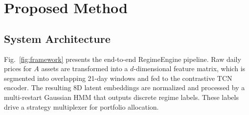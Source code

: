 \documentclass[conference, twocolumn]{IEEEtran}
\begin{document}
\section{Proposed Method}
\label{sec:method}

\subsection{System Architecture}

Fig.~\ref{fig:framework} presents the end-to-end RegimeEngine pipeline. Raw daily prices for $A$ assets are transformed into a $d$-dimensional feature matrix, which is segmented into overlapping 21-day windows and fed to the contrastive TCN encoder. The resulting 8D latent embeddings are normalized and processed by a multi-restart Gaussian HMM that outputs discrete regime labels. These labels drive a strategy multiplexer for portfolio allocation.
\end{document}
